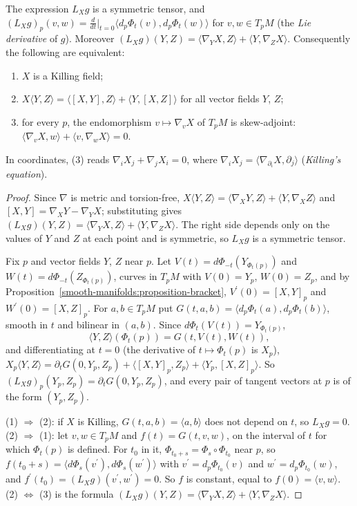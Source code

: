 \begin{proposition}\label{riemannian-geometry:proposition-killing}
The expression $L_Xg$ is a symmetric tensor, and $(L_Xg)_p(v, w) = \frac{d}{dt}\big|_{t=0}\langle d_p\Phi_t(v), d_p\Phi_t(w)\rangle$ for $v, w \in T_pM$ (the \emph{Lie derivative}
of $g$). Moreover $(L_Xg)(Y, Z) = \langle\nabla_YX, Z\rangle + \langle Y, \nabla_ZX\rangle$. Consequently the following are equivalent:
\begin{enumerate}
\item $X$ is a Killing field;
\item $X\langle Y, Z\rangle = \langle[X, Y], Z\rangle + \langle Y, [X, Z]\rangle$ for all vector fields $Y$, $Z$;
\item for every $p$, the endomorphism $v \mapsto \nabla_vX$ of $T_pM$ is skew-adjoint: $\langle\nabla_vX, w\rangle + \langle v, \nabla_wX\rangle = 0$.
\end{enumerate}
In coordinates, (3) reads $\nabla_iX_j + \nabla_jX_i = 0$, where $\nabla_iX_j = \langle\nabla_{\partial_i}X, \partial_j\rangle$ (\emph{Killing's equation}).
\end{proposition}

\begin{proof}
Since $\nabla$ is metric and torsion-free, $X\langle Y, Z\rangle = \langle\nabla_XY, Z\rangle + \langle Y, \nabla_XZ\rangle$ and $[X, Y] = \nabla_XY - \nabla_YX$;
substituting gives $(L_Xg)(Y, Z) = \langle\nabla_YX, Z\rangle + \langle Y, \nabla_ZX\rangle$. The right side depends only on the values of $Y$ and $Z$ at each point and
is symmetric, so $L_Xg$ is a symmetric tensor.

Fix $p$ and vector fields $Y$, $Z$ near $p$. Let $V(t) = d\Phi_{-t}(Y_{\Phi_t(p)})$ and $W(t) = d\Phi_{-t}(Z_{\Phi_t(p)})$, curves in $T_pM$ with $V(0) = Y_p$,
$W(0) = Z_p$, and by Proposition~\ref{smooth-manifolds:proposition-bracket}, $V^{\prime}(0) = [X, Y]_p$ and $W^{\prime}(0) = [X, Z]_p$. For $a, b \in T_pM$ put
$G(t, a, b) = \langle d_p\Phi_t(a), d_p\Phi_t(b)\rangle$, smooth in $t$ and bilinear in $(a, b)$. Since $d\Phi_t(V(t)) = Y_{\Phi_t(p)}$,
\[
\langle Y, Z\rangle(\Phi_t(p)) = G(t, V(t), W(t)),
\]
and differentiating at $t = 0$ (the derivative of $t \mapsto \Phi_t(p)$ is $X_p$),
$X_p\langle Y, Z\rangle = \partial_tG(0, Y_p, Z_p) + \langle[X, Y]_p, Z_p\rangle + \langle Y_p, [X, Z]_p\rangle$. So $(L_Xg)_p(Y_p, Z_p) = \partial_tG(0, Y_p, Z_p)$, and
every pair of tangent vectors at $p$ is of the form $(Y_p, Z_p)$.

(1) $\Rightarrow$ (2): if $X$ is Killing, $G(t, a, b) = \langle a, b\rangle$ does not depend on $t$, so $L_Xg = 0$. (2) $\Rightarrow$ (1): let $v, w \in T_pM$ and
$f(t) = G(t, v, w)$, on the interval of $t$ for which $\Phi_t(p)$ is defined. For $t_0$ in it, $\Phi_{t_0 + s} = \Phi_s \circ \Phi_{t_0}$ near $p$, so
$f(t_0 + s) = \langle d\Phi_s(v^{\prime}), d\Phi_s(w^{\prime})\rangle$ with $v^{\prime} = d_p\Phi_{t_0}(v)$ and $w^{\prime} = d_p\Phi_{t_0}(w)$, and
$f^{\prime}(t_0) = (L_Xg)(v^{\prime}, w^{\prime}) = 0$. So $f$ is constant, equal to $f(0) = \langle v, w\rangle$. (2) $\Leftrightarrow$ (3) is the formula
$(L_Xg)(Y, Z) = \langle\nabla_YX, Z\rangle + \langle Y, \nabla_ZX\rangle$.
\end{proof}

